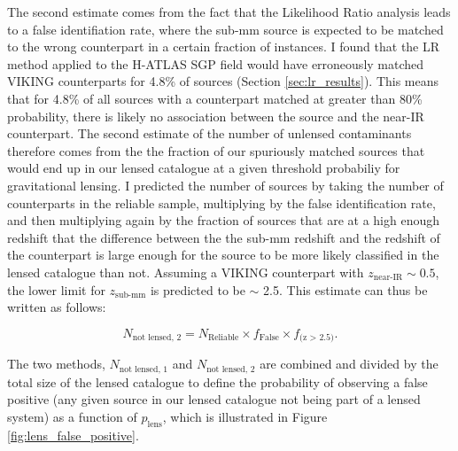 The second estimate comes from the fact that the Likelihood Ratio analysis leads to a false identifiation rate, where the sub-mm source is expected to be matched to the wrong counterpart in a certain fraction of instances. I found that the LR method applied to the H-ATLAS SGP field would have erroneously matched VIKING counterparts for 4.8\% of sources (Section \ref{sec:lr_results}). This means that for 4.8\% of all sources with a counterpart matched at greater than 80\% probability, there is likely no association between the source and the near-IR counterpart. The second estimate of the number of unlensed contaminants therefore comes from the the fraction of our spuriously matched sources that would end up in our lensed catalogue at a given threshold probabiliy for gravitational lensing. I predicted the number of sources by taking the number of counterparts in the reliable sample, multiplying by the false identification rate, and then multiplying again by the fraction of sources that are at a high enough redshift that the difference between the the sub-mm redshift and the redshift of the counterpart is large enough for the source to be more likely classified in the lensed catalogue than not. Assuming a VIKING counterpart with $z_\textrm{near-IR} \sim 0.5$, the lower limit for $z_\textrm{sub-mm}$ is predicted to be $\sim$ 2.5. This estimate can thus be written as follows:

\begin{equation}
N_{\textrm{not lensed, 2}} = N_{\textrm{Reliable}} \times f_{\textrm{False}} \times f_{\textrm{(z > 2.5)}}.
\end{equation} 

The two methods, $N_{\textrm{not lensed, 1}}$ and $N_{\textrm{not lensed, 2}}$ are combined and divided by the total size of the lensed catalogue to define the probability of observing a false positive (any given source in our lensed catalogue not being part of a lensed system) as a function of $p_{\textrm{lens}}$, which is illustrated in Figure \ref{fig:lens_false_positive}.

